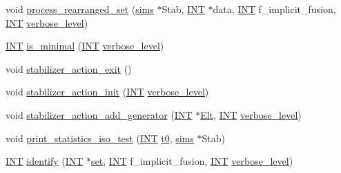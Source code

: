 \begin{DoxyCompactItemize}
void \mbox{\hyperlink{classisomorph_a7767fd5f1da6dfd7f93810be99ba4ab6}{process\+\_\+rearranged\+\_\+set}} (\mbox{\hyperlink{classsims}{sims}} $\ast$Stab, \mbox{\hyperlink{galois_8h_a09fddde158a3a20bd2dcadb609de11dc}{I\+NT}} $\ast$data, \mbox{\hyperlink{galois_8h_a09fddde158a3a20bd2dcadb609de11dc}{I\+NT}} f\+\_\+implicit\+\_\+fusion, \mbox{\hyperlink{galois_8h_a09fddde158a3a20bd2dcadb609de11dc}{I\+NT}} \mbox{\hyperlink{simeon_8_c_a818073fbcc2f439e7c56952f67386122}{verbose\+\_\+level}})
\item 
\mbox{\hyperlink{galois_8h_a09fddde158a3a20bd2dcadb609de11dc}{I\+NT}} \mbox{\hyperlink{classisomorph_a99d321a02825c08837425be0c555a0c7}{is\+\_\+minimal}} (\mbox{\hyperlink{galois_8h_a09fddde158a3a20bd2dcadb609de11dc}{I\+NT}} \mbox{\hyperlink{simeon_8_c_a818073fbcc2f439e7c56952f67386122}{verbose\+\_\+level}})
\item 
void \mbox{\hyperlink{classisomorph_afaa2e0e84d13a3116bb46c387b1fca61}{stabilizer\+\_\+action\+\_\+exit}} ()
\item 
void \mbox{\hyperlink{classisomorph_af2775c095770cbeae014806409f0c4d3}{stabilizer\+\_\+action\+\_\+init}} (\mbox{\hyperlink{galois_8h_a09fddde158a3a20bd2dcadb609de11dc}{I\+NT}} \mbox{\hyperlink{simeon_8_c_a818073fbcc2f439e7c56952f67386122}{verbose\+\_\+level}})
\item 
void \mbox{\hyperlink{classisomorph_ae91af86c9c82cf9c5c7ee24a60e59460}{stabilizer\+\_\+action\+\_\+add\+\_\+generator}} (\mbox{\hyperlink{galois_8h_a09fddde158a3a20bd2dcadb609de11dc}{I\+NT}} $\ast$\mbox{\hyperlink{simeon_8_c_aec1406935bdb1fee3561fcb840964100}{Elt}}, \mbox{\hyperlink{galois_8h_a09fddde158a3a20bd2dcadb609de11dc}{I\+NT}} \mbox{\hyperlink{simeon_8_c_a818073fbcc2f439e7c56952f67386122}{verbose\+\_\+level}})
\item 
void \mbox{\hyperlink{classisomorph_a92a0591020464dd4974d2b17f7be862b}{print\+\_\+statistics\+\_\+iso\+\_\+test}} (\mbox{\hyperlink{galois_8h_a09fddde158a3a20bd2dcadb609de11dc}{I\+NT}} \mbox{\hyperlink{translation__plane__main_8_c_a4268f4fe222ffb119218a0199f5e1904}{t0}}, \mbox{\hyperlink{classsims}{sims}} $\ast$Stab)
\item 
\mbox{\hyperlink{galois_8h_a09fddde158a3a20bd2dcadb609de11dc}{I\+NT}} \mbox{\hyperlink{classisomorph_a78ecf843b9f6ca1cfd666e222edd90ae}{identify}} (\mbox{\hyperlink{galois_8h_a09fddde158a3a20bd2dcadb609de11dc}{I\+NT}} $\ast$\mbox{\hyperlink{nauty_8h_a9690bea211101f22a5e154087590c3da}{set}}, \mbox{\hyperlink{galois_8h_a09fddde158a3a20bd2dcadb609de11dc}{I\+NT}} f\+\_\+implicit\+\_\+fusion, \mbox{\hyperlink{galois_8h_a09fddde158a3a20bd2dcadb609de11dc}{I\+NT}} \mbox{\hyperlink{simeon_8_c_a818073fbcc2f439e7c56952f67386122}{verbose\+\_\+level}})

\end{DoxyCompactItemize}
